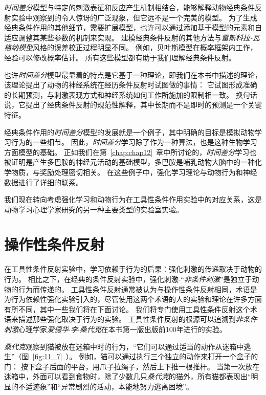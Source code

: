 \textit{时间差分}模型与特定的刺激表征和反应产生机制相结合，能够解释动物经典条件反射实验中观察到的令人惊讶的广泛现象，但它远不是一个完美的模型。
为了生成经典条件作用的其他细节，需要扩展模型，也许可以通过添加基于模型的元素和自适应调整其某些参数的机制来实现。
建模经典条件反射的其他方法与\textit{雷斯科拉-瓦格纳模型}风格的误差校正过程明显不同。
例如，贝叶斯模型在概率框架内工作，经验可以修改概率估计。
所有这些模型都有助于我们理解经典条件反射。


也许\textit{时间差分}模型最显着的特点是它基于一种理论，即我们在本书中描述的理论，该理论提出了动物的神经系统在经历条件反射时试图做的事情：
它试图形成准确的长期预测，与刺激表现方式和神经系统如何工作所施加的限制相一致。
换句话说，它提出了经典条件反射的规范性解释，其中长期而不是即时的预测是一个关键特征。


经典条件作用的\textit{时间差分}模型的发展就是一个例子，其中明确的目标是模拟动物学习行为的一些细节。
因此，\textit{时间差分}学习除了作为一种算法，也是这种生物学习方面模型的基础。
正如我们在第~\ref{chap:chap12}~章中所讨论的，\textit{时间差分}学习也被证明是产生多巴胺的神经元活动的基础模型，多巴胺是哺乳动物大脑中的一种化学物质，与奖励处理密切相关。
在这些例子中，强化学习理论与动物行为和神经数据进行了详细的联系。


我们现在转向考虑强化学习和动物行为在工具性条件作用实验中的对应关系，这是动物学习心理学家研究的另一种主要类型的实验室实验。


\section{操作性条件反射} \label{sec:instrumental_conditioning}

在工具性条件反射实验中，学习依赖于行为的后果：强化刺激的传递取决于动物的行为。
相比之下，在经典的条件反射实验中，强化刺激-“\textit{非条件刺激}”是独立于动物的行为而传递的。
工具性条件反射通常被认为与操作性条件反射相同，术语是为行为依赖性强化实验引入的\cite{skinner2019behavior}，尽管使用这两个术语的人的实验和理论在许多方面有所不同，其中一些我们将在下面讨论。
我们将专门使用工具性条件反射这个术语来描述那些强化取决于行为的实验。
工具性条件反射的根源可以追溯到\textit{非条件刺激}心理学家\textit{爱德华$\cdot$李$\cdot$桑代克}在本书第一版出版前100年进行的实验。


\textit{桑代克}观察到猫被放在迷箱中时的行为，“它们可以通过适当的动作从迷箱中逃生”（图~\ref{fig:11_7}~）。
例如，猫可以通过执行三个独立的动作来打开一个盒子的门：
按下盒子后面的平台，用爪子拉绳子，然后上下推一根推杆。
当第一次放在迷箱中，外面可以看到食物时，除了少数几只\textit{桑代克}的猫外，所有猫都表现出“明显的不适迹象”和“异常剧烈的活动，本能地努力逃离困境”\cite{thorndike1898animal}。


